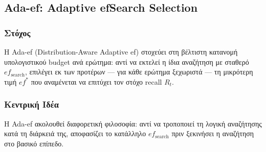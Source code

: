 \documentclass[12pt,a4paper]{article}
\begin{document}
\subsection{Ada-ef: Adaptive efSearch Selection}

\subsubsection*{Στόχος}
Η Ada-ef (Distribution-Aware Adaptive ef) \cite{adaef2025} στοχεύει στη βέλτιστη κατανομή υπολογιστικού budget ανά ερώτημα: αντί να εκτελεί η ίδια αναζήτηση με σταθερό $ef_{\text{search}}$, επιλέγει εκ των προτέρων — για κάθε ερώτημα ξεχωριστά — τη μικρότερη τιμή $ef^*$ που αναμένεται να επιτύχει τον στόχο recall $R_t$.

\subsubsection*{Κεντρική Ιδέα}
Η Ada-ef ακολουθεί διαφορετική φιλοσοφία: αντί να τροποποιεί τη λογική αναζήτησης κατά τη διάρκειά της, αποφασίζει το κατάλληλο $ef_{\text{search}}$ πριν ξεκινήσει η αναζήτηση στο βασικό επίπεδο.
\end{document}
